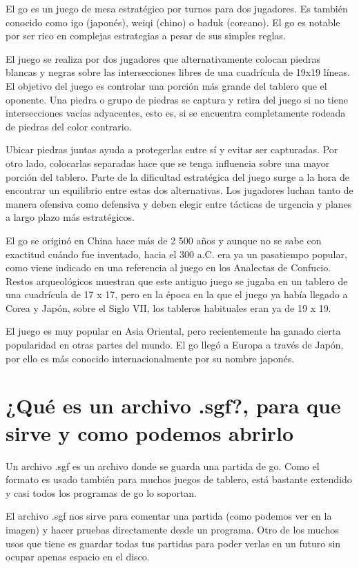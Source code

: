\documentclass[12pt,a4paper]{report}
\begin{document}
El go es un juego de mesa estratégico por turnos para dos jugadores. Es 
también conocido como igo (japonés), weiqi (chino) o baduk (coreano). El go 
es notable por ser rico en complejas estrategias a pesar de sus simples reglas.

El juego se realiza por dos jugadores que alternativamente colocan piedras
blancas y negras sobre las intersecciones libres de una cuadrícula de 19x19
líneas. El objetivo del juego es controlar una porción más grande del tablero
que el oponente. Una piedra o grupo de piedras se captura y retira del juego si
no tiene intersecciones vacías adyacentes, esto es, si se encuentra
completamente rodeada de piedras del color contrario.

Ubicar piedras juntas ayuda a protegerlas entre sí y evitar ser capturadas. Por
otro lado, colocarlas separadas hace que se tenga influencia sobre una mayor
porción del tablero. Parte de la dificultad estratégica del juego surge a la
hora de encontrar un equilibrio entre estas dos alternativas. Los jugadores
luchan tanto de manera ofensiva como defensiva y deben elegir entre tácticas de
urgencia y planes a largo plazo más estratégicos.

El go se originó en China hace más de 2 500 años y aunque no se sabe con
exactitud cuándo fue inventado, hacia el 300 a.C. era ya un pasatiempo popular,
como viene indicado en una referencia al juego en los Analectas de Confucio.
Restos arqueológicos muestran que este antiguo juego se jugaba en un tablero de
una cuadrícula de 17 x 17, pero en la época en la que el juego ya había llegado
a Corea y Japón, sobre el Siglo VII, los tableros habituales eran ya de 19 x 19.

El juego es muy popular en Asia Oriental, pero recientemente ha ganado cierta
popularidad en otras partes del mundo. El go llegó a Europa a través de Japón,
por ello es más conocido internacionalmente por su nombre japonés.


\section{¿Qué es un archivo .sgf?, para que sirve y como podemos abrirlo}

\label{sgf} Un archivo .sgf es un archivo donde se guarda una partida de
go. Como el formato es usado también para muchos juegos de tablero, está
bastante extendido y casi todos los programas de go lo soportan.

El archivo .sgf nos sirve para comentar una partida (como podemos ver en la
imagen) y hacer pruebas directamente desde un programa. Otro de los muchos
usos que tiene es guardar todas tus partidas para poder verlas en un futuro sin
ocupar apenas espacio en el disco. %
\end{document}
